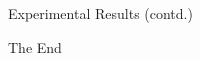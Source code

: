 \documentclass[9pt]{beamer}
\begin{document}
\begin{frame}{Experimental Results (contd.)}
\end{frame}






\begin{frame}

\Huge{\centerline{The End}}
\end{frame}
\end{document}
